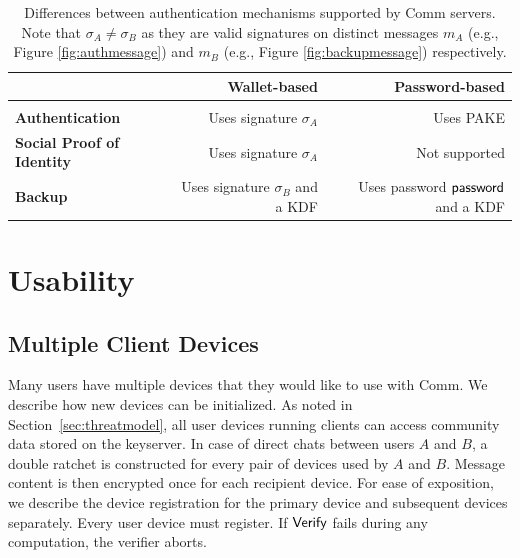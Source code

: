 \documentclass{article}
\newcommand{\pw}{{\sf password}}
\newcommand{\verify}{\sf Verify}
\begin{document}



\begin{table}[h]
        \centering
        \begin{tabular}{lrr}
             & \textbf{Wallet-based} & \textbf{Password-based}\\
             \hline\\
             \textbf{Authentication} & Uses signature $\sigma_A$ & Uses PAKE\\
             \textbf{Social Proof of Identity} & Uses signature $\sigma_A$ & Not supported\\
             \textbf{Backup} & Uses signature $\sigma_B$ and a KDF & Uses password $\pw$ and a KDF\\
        \end{tabular}
        \caption{Differences between authentication mechanisms supported by Comm servers. Note that $\sigma_A \neq \sigma_B$ as they are valid signatures on distinct messages $m_A$ (e.g., Figure \ref{fig:authmessage}) and $m_B$ (e.g., Figure \ref{fig:backupmessage}) respectively.}
        \label{tab:auth}
\end{table}

\section{Usability}
\label{sec:usability}

\subsection{Multiple Client Devices}

Many users have multiple devices that they would like to use with Comm. We describe how new devices can be initialized. As noted in Section~\ref{sec:threatmodel}, all user devices running clients can access community data stored on the keyserver. In case of direct chats between users $A$ and $B$, a double ratchet is constructed for every pair of devices used by $A$ and $B$. Message content is then encrypted once for each recipient device. For ease of exposition, we describe the device registration for the primary device and subsequent devices separately. Every user device must register. If $\verify$ fails during any computation, the verifier aborts.
\end{document}
